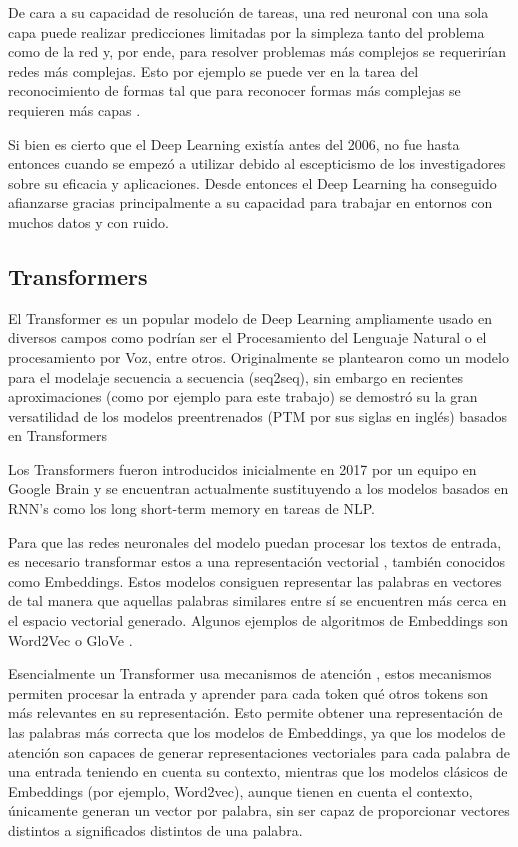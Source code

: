 De cara a su capacidad de resolución de tareas, una red neuronal con una sola capa puede realizar predicciones limitadas por la simpleza tanto del problema como de la red y, por ende, para resolver problemas más complejos se requerirían redes más complejas. Esto por ejemplo se puede ver en la tarea del reconocimiento de formas tal que para reconocer formas más complejas se requieren más capas \cite{rusk2016deep}. 

Si bien es cierto que el Deep Learning existía antes del 2006, no fue hasta entonces cuando se empezó a utilizar debido al escepticismo de los investigadores sobre su eficacia y aplicaciones. Desde entonces el Deep Learning ha conseguido afianzarse gracias principalmente a su capacidad para trabajar en entornos con muchos datos y con ruido\cite{wason2018deep}. 

\subsection{Transformers}
El Transformer \cite{vaswani2018tensor2tensor} es un popular modelo de Deep Learning ampliamente usado en diversos campos como podrían ser el Procesamiento del Lenguaje Natural o el procesamiento por Voz, entre otros. Originalmente se plantearon como un modelo para el modelaje secuencia a secuencia (seq2seq\cite{sutskever2014sequence}), sin embargo en recientes aproximaciones (como por ejemplo para este trabajo) se demostró su la gran versatilidad de los modelos preentrenados (PTM por sus siglas en inglés) basados en Transformers \cite{qiu2020pre}

Los Transformers fueron introducidos inicialmente en 2017 por un equipo en Google Brain \cite{vaswani2017attention} y se encuentran actualmente sustituyendo a los modelos basados en RNN's como los long short-term memory \cite{hochreiter1997long} en tareas de NLP.

Para que las redes neuronales del modelo puedan procesar los textos de entrada, es necesario transformar estos a una representación vectorial \cite{patil2023survey}, también conocidos como Embeddings. Estos modelos consiguen representar las palabras en vectores de tal manera que aquellas palabras similares entre sí se encuentren más cerca en el espacio vectorial generado. Algunos ejemplos de algoritmos de Embeddings son Word2Vec \cite{church2017word2vec} o GloVe \cite{pennington2014glove}.

Esencialmente un Transformer usa mecanismos de atención \cite{niu2021review}, estos mecanismos permiten procesar la entrada y aprender para cada token qué otros tokens son más relevantes en su representación. Esto permite obtener una representación de las palabras más correcta que los modelos de Embeddings, ya que los modelos de atención son capaces de generar representaciones vectoriales para cada palabra de una entrada teniendo en cuenta su contexto, mientras que los modelos clásicos de Embeddings (por ejemplo, Word2vec), aunque tienen en cuenta el contexto, únicamente generan un vector por palabra, sin ser capaz de proporcionar vectores distintos a significados distintos de una palabra.

